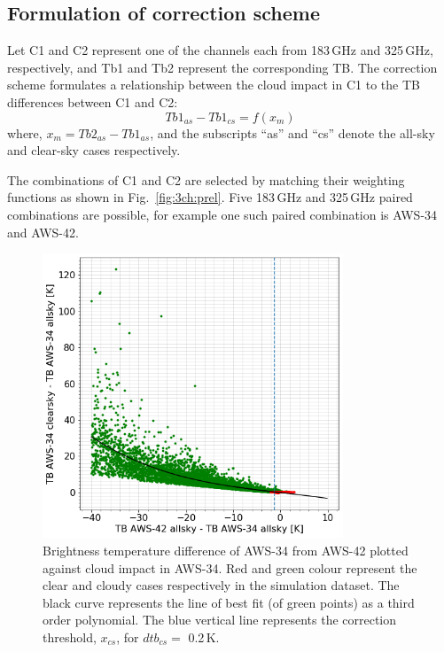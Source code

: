 \documentclass[12pt]{article}
\begin{document}
\subsection{Formulation of correction scheme}
\label{sec:correction:scheme}
%
Let C1 and C2 represent one of the channels each from 183\,GHz and 325\,GHz,
respectively, and Tb1 and Tb2 represent the corresponding TB. The correction
scheme formulates a relationship between the cloud impact in C1 to the TB
differences between C1 and C2:
\begin{equation}
Tb1_{as}-Tb1_{cs} = f(x_m)
\label{eq:TB:diff}
\end{equation}
where, $x_m = Tb2_{as} - Tb1_{as}$, and the subscripts ``as'' and ``cs'' denote the all-sky and clear-sky cases respectively.  

The combinations of C1 and C2 are selected by matching their weighting
functions as shown in Fig.~\ref{fig:3ch:prel}. Five 183\,GHz and 325\,GHz paired
combinations are possible, for example one such paired combination is AWS-34
and AWS-42.

\begin{figure}[!tb]
	\centering
	\includegraphics[height=85mm]{fit_AWS-34_AWS-42}\hspace{5mm}%
	\caption{Brightness temperature difference of AWS-34 from AWS-42 plotted
      against cloud impact in AWS-34. Red and green colour represent the clear
      and cloudy cases respectively in the simulation dataset. The black curve
      represents the line of best fit (of green points) as a third order
      polynomial. The blue vertical line represents the correction threshold,
      $x_{cs}$, for $dtb_{cs} =$ 0.2\,K. }
	\label{fig:fit:c34-42}
\end{figure}
%
\end{document}
